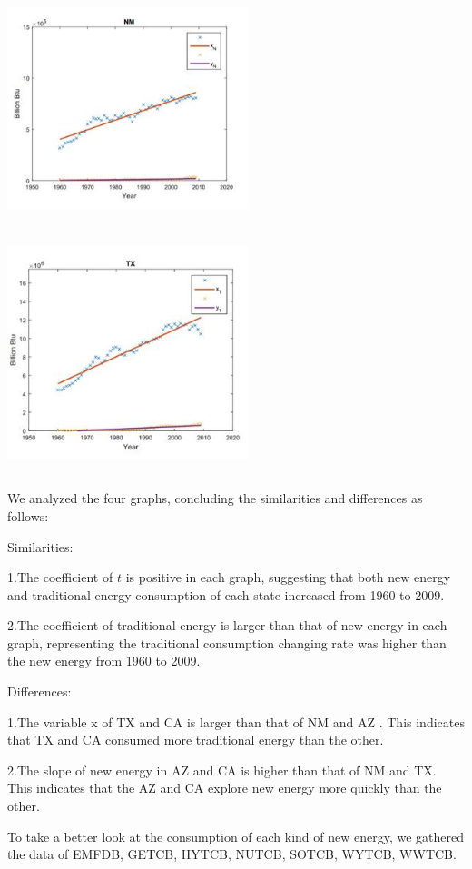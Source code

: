 \documentclass[12pt]{article}
\begin{document}
\includegraphics[width=7cm,height=7cm]{b3.jpg}
\includegraphics[width=7cm,height=7cm]{b4.jpg}

We analyzed the four graphs, concluding the similarities and differences as follows:

Similarities:

1.The coefficient of $t$ is positive in each graph, suggesting that both new energy and traditional energy consumption of each state increased from 1960 to 2009.

2.The coefficient of traditional energy is larger than that of new energy in each graph, representing the traditional consumption changing rate was higher than the new energy from 1960 to 2009.

Differences:

1.The variable x of TX and CA is larger than that of NM and AZ . This indicates that TX and CA consumed more traditional energy than the other.

2.The slope of new energy in AZ and CA is higher than that of NM and TX. This indicates that the AZ and CA explore new energy more quickly than the other.

To take a better look at the consumption of each kind of new energy, we gathered the data of EMFDB, GETCB, HYTCB, NUTCB, SOTCB, WYTCB, WWTCB.
\end{document}
